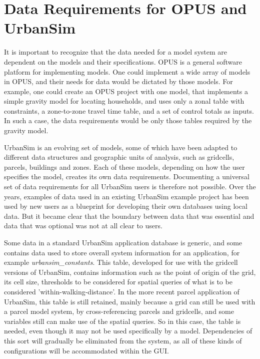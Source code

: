 \section{Data Requirements for OPUS and UrbanSim}
It is important to recognize that the data needed for a model system are dependent on the models and their
specifications.  OPUS is a general software platform for implementing models.  One could implement a wide
array of models in OPUS, and their needs for data would be dictated by those models.  For example, one
could create an OPUS project with one model, that implements a simple gravity model for locating households,
and uses only a zonal table with constraints, a zone-to-zone travel time table, and a set of control totals as
inputs.  In such a case, the data requirements would be only those tables required by the gravity model.

UrbanSim is an evolving set of models, some of which have been adapted to different data structures and
geographic units of analysis, such as gridcells, parcels, buildings and zones.  Each of these models, depending
on how the user specifies the model, creates its own data requirements.  Documenting a universal set of 
data requirements for all UrbanSim users is therefore not possible.  Over the years, examples of data used
in an existing UrbanSim example project has been used by new users as a blueprint for developing their
own databases using local data.  But it became clear that the boundary between data that was essential and
data that was optional was not at all clear to users.

Some data in a standard UrbanSim application database is generic, and some contains data used to store
overall system information for an application, for example \emph{urbansim_constants}.  This table, developed
for use with the gridcell versions of UrbanSim, contains information such as the point of origin of the grid,
its cell size, thresholds to be considered for spatial queries of what is to be considered 'within-walking-distance'.
In the more recent parcel application of UrbanSim, this table is still retained, mainly because a grid can still
be used with a parcel model system, by cross-referencing parcels and gridcells, and some variables still can
make use of the spatial queries.  So in this case, the table is needed, even though it may not be used specifically
by a model.  Dependencies of this sort will gradually be eliminated from the system, as all of these kinds of
configurations will be accommodated within the GUI.

